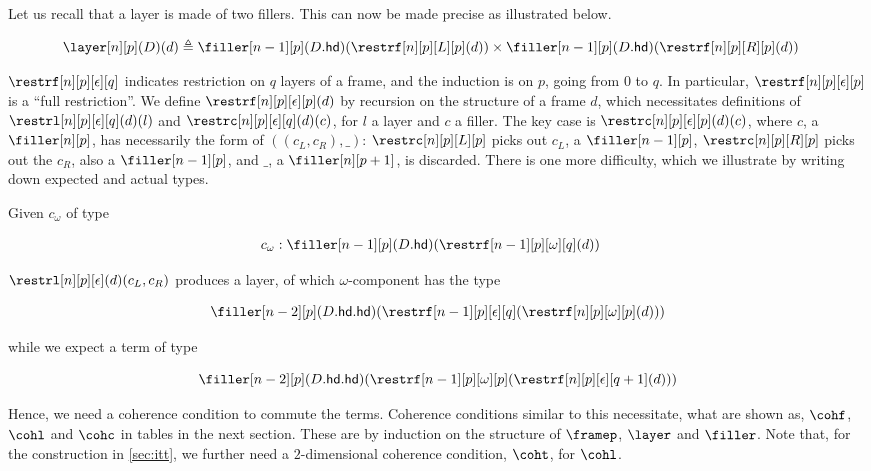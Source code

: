 \documentclass[10pt]{art.cls/art}
\newcommand{\defeq}{\ensuremath{\triangleq}}
\newcommand{\hd}{\ensuremath{\mathsf{hd}}}
\begin{document}
Let us recall that a layer is made of two fillers. This can now be made precise as illustrated below.

\begin{align*}
  \layer[n][p](D)(d) & \defeq \filler[n-1][p](D.\hd)(\restrf[n][p][L][p](d)) \times \filler[n-1][p](D.\hd)(\restrf[n][p][R][p](d))
\end{align*}

$\restrf[n][p][\epsilon][q]$ indicates restriction on $q$ layers of a frame, and the induction is on $p$, going from $0$ to $q$. In particular, $\restrf[n][p][\epsilon][p]$ is a ``full restriction''. We define $\restrf[n][p][\epsilon][p](d)$ by recursion on the structure of a frame $d$, which necessitates definitions of $\restrl[n][p][\epsilon][q](d)(l)$ and $\restrc[n][p][\epsilon][q](d)(c)$, for $l$ a layer and $c$ a filler. The key case is $\restrc[n][p][\epsilon][p](d)(c)$, where $c$, a $\filler[n][p]$, has necessarily the form of $((c_L, c_R), \_)$: $\restrc[n][p][L][p]$ picks out $c_L$, a $\filler[n-1][p]$, $\restrc[n][p][R][p]$ picks out the $c_R$, also a $\filler[n-1][p]$, and $\_$, a $\filler[n][p+1]$, is discarded. There is one more difficulty, which we illustrate by writing down expected and actual types.

Given $c_\omega$ of type

\begin{align*}
  c_\omega & : \filler[n-1][p](D.\hd)(\restrf[n-1][p][\omega][q](d))
\end{align*}

$\restrl[n][p][\epsilon](d)(c_L, c_R)$ produces a layer, of which $\omega$-component has the type

\begin{equation*}
  \filler[n-2][p](D.\hd.\hd)(\restrf[n-1][p][\epsilon][q](\restrf[n][p][\omega][p](d)))
\end{equation*}

while we expect a term of type

\begin{equation*}
  \filler[n-2][p](D.\hd.\hd)(\restrf[n-1][p][\omega][p](\restrf[n][p][\epsilon][q+1](d)))
\end{equation*}

Hence, we need a coherence condition to commute the terms. Coherence conditions similar to this necessitate, what are shown as, $\cohf$, $\cohl$ and $\cohc$ in tables in the next section. These are by induction on the structure of $\framep$, $\layer$ and $\filler$. Note that, for the construction in \ref{sec:itt}, we further need a $2$-dimensional coherence condition, $\coht$, for $\cohl$.
\end{document}
